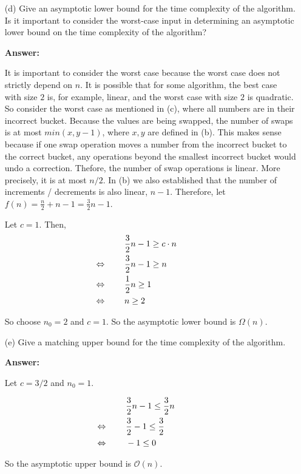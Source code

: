 \documentclass[14pt]{extreport}
\newcommand{\eq}[0]{\llap{\( \Leftrightarrow \) \qquad}}
\newcommand{\answer}[0]{\medskip \textbf{Answer:} \medskip}
\newcommand{\Bigo}[0]{\mathcal{O}}
\begin{document}
\begin{enumerate}
    \item[(d)] Give an asymptotic lower bound for the time complexity of the algorithm. Is it important to consider the worst-case input in determining an asymptotic lower bound on the time complexity of the algorithm?
    
        \answer

        It is important to consider the worst case because the worst case does not strictly depend on \( n \). It is possible that for some algorithm, the best case with size \( 2 \) is, for example, linear, and the worst case with size \( 2 \) is quadratic. So consider the worst case as mentioned in (c), where all numbers are in their incorrect bucket. Because the values are being swapped, the number of swaps is at most \( min(x, y - 1) \), where \( x, y \) are defined in (b). This makes sense because if one swap operation moves a number from the incorrect bucket to the correct bucket, any operations beyond the smallest incorrect bucket would undo a correction. Thefore, the number of swap operations is linear. More precisely, it is at most \( n / 2 \). In (b) we also established that the number of increments / decrements is also linear, \( n - 1 \). Therefore, let \( f(n) = \frac{n}{2} + n - 1 = \frac{3}{2}n - 1 \).

        \medskip
        
        Let \( c = 1 \). Then,
        \begin{align*}
            & \frac{3}{2}n - 1 \geq c \cdot n \\
            &\eq \frac{3}{2}n - 1 \geq n \\
            &\eq \frac{1}{2}n \geq 1 \\
            &\eq n \geq 2
        \end{align*}

        So choose \( n_0 = 2 \) and \( c = 1 \). So the asymptotic lower bound is \( \Omega(n) \).

    \item[(e)] Give a matching upper bound for the time complexity of the algorithm.
    
        \answer

        Let \( c = 3/2 \) and \( n_0 = 1 \).

        \begin{align*}
            & \frac{3}{2}n - 1 \leq \frac{3}{2}n \\
            &\eq \frac{3}{2} -1 \leq \frac{3}{2} \\
            &\eq -1 \leq 0
        \end{align*} 

        So the asymptotic upper bound is \( \Bigo(n) \).

\end{enumerate}
\newpage
\end{document}
